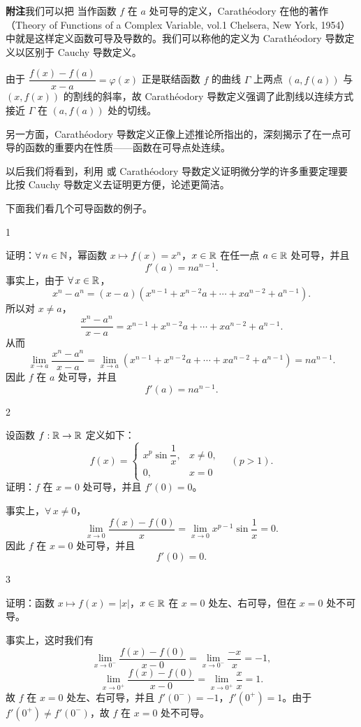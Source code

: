\textbf{附注}\quad 我们可以把 当作函数 \(f\) 在 \(a\) 处可导的定义，Carathéodory 在他的著作（Theory of Functions of a Complex Variable, vol.1 Chelsera, New York, 1954）中就是这样定义函数可导及导数的。我们可以称他的定义为 Carathéodory 导数定义以区别于 Cauchy 导数定义。

由于 \(\dfrac{f(x)-f(a)}{x-a}=\varphi(x)\) 正是联结函数 \(f\) 的曲线 \(\Gamma\) 上两点 \((a,f(a))\) 与 \((x,f(x))\) 的割线的斜率，故 Carathéodory 导数定义强调了此割线以连续方式接近 \(\Gamma\) 在 \((a,f(a))\) 处的切线。

另一方面，Carathéodory 导数定义正像上述推论所指出的，深刻揭示了在一点可导的函数的重要内在性质——函数在可导点处连续。

以后我们将看到，利用 或 Carathéodory 导数定义证明微分学的许多重要定理要比按 Cauchy 导数定义去证明更方便，论述更简洁。

下面我们看几个可导函数的例子。

\begin{sourceexample}{1}

	证明：\(\forall\,n\in\mathbb{N}\)，幂函数 \(x\longmapsto f(x)=x^n\)，\(x\in\mathbb{R}\) 在任一点 \(a\in\mathbb{R}\) 处可导，并且
	\[
	f'(a)=na^{n-1}.
	\]
	事实上，由于 \(\forall\,x\in\mathbb{R}\)，
	\[
	x^n-a^n=(x-a)(x^{n-1}+x^{n-2}a+\cdots+xa^{n-2}+a^{n-1}).
	\]
	所以对 \(x\neq a\)，
	\[
	\frac{x^n-a^n}{x-a}=x^{n-1}+x^{n-2}a+\cdots+xa^{n-2}+a^{n-1}.
	\]
	从而
	\[
	\lim_{x\to a}\frac{x^n-a^n}{x-a}=\lim_{x\to a}(x^{n-1}+x^{n-2}a+\cdots+xa^{n-2}+a^{n-1})=na^{n-1}.
	\]
	因此 \(f\) 在 \(a\) 处可导，并且
	\[
	f'(a)=na^{n-1}.
	\]

\end{sourceexample}

\begin{sourceexample}{2}

	设函数 \(f:\mathbb{R}\to\mathbb{R}\) 定义如下：
	\[
	f(x)=\begin{cases} x^p\sin\dfrac1x, & x\neq0, \\ 0, & x=0 \end{cases}\quad(p>1).
	\]
	证明：\(f\) 在 \(x=0\) 处可导，并且 \(f'(0)=0\)。

	事实上，\(\forall\,x\neq0\)，
	\[
	\lim_{x\to0}\frac{f(x)-f(0)}x=\lim_{x\to0}x^{p-1}\sin\frac1x=0.
	\]
	因此 \(f\) 在 \(x=0\) 处可导，并且
	\[
	f'(0)=0.
	\]

\end{sourceexample}

\begin{sourceexample}{3}

	证明：函数 \(x\longmapsto f(x)=|x|\)，\(x\in\mathbb{R}\) 在 \(x=0\) 处左、右可导，但在 \(x=0\) 处不可导。

	事实上，这时我们有
	\[
	\lim_{x\to0^-}\frac{f(x)-f(0)}{x-0}=\lim_{x\to0^-}\frac{-x}{x}=-1,
	\]
	\[
	\lim_{x\to0^+}\frac{f(x)-f(0)}{x-0}=\lim_{x\to0^+}\frac{x}{x}=1.
	\]
	故 \(f\) 在 \(x=0\) 处左、右可导，并且 \(f'(0^-)=-1\)，\(f'(0^+)=1\)。由于 \(f'(0^+)\neq f'(0^-)\)，故 \(f\) 在 \(x=0\) 处不可导。

\end{sourceexample}

